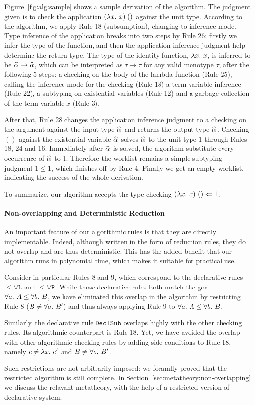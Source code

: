 Figure~\ref{fig:alg:sample} shows a sample derivation of the algorithm.
The judgment given is to check the application $(\lam x)~()$ against the unit type.
According to the algorithm, we apply Rule 18 (subsumption), changing to inference mode.
Type inference of the application breaks into two steps by Rule 26:
firstly we infer the type of the function,
and then the application inference judgment help determine the return type.
The type of the identity function, $\lam x$, is inferred to be $\al \to \al$,
which can be interpreted as $\tau \to \tau$ for any valid monotype $\tau$,
after the following 5 steps:
a checking on the body of the lambda function (Rule 25),
calling the inference mode for the checking (Rule 18)
a term variable inference (Rule 22),
a subtyping on existential variables (Rule 12) and
a garbage collection of the term variable $x$ (Rule 3).

After that, Rule 28 changes the application inference judgment to
a checking on the argument against the input type $\al$ and returns the output type $\al$.
Checking $()$ against the existential variable $\al$ solves $\al$ to the unit type $1$
through Rules 18, 24 and 16.
Immediately after $\al$ is solved, the algorithm substitute every occurrence of $\al$ to $1$.
Therefore the worklist remains a simple subtyping judgment $1 \le 1$, which finishes off by Rule 4.
Finally we get an empty worklist, indicating the success of the whole derivation.

To summarize, our algorithm accepts the type checking $(\lam x)~() \Lto 1$.



\paragraph{Non-overlapping and Deterministic Reduction}
An important feature of our algorithmic rules is that they are directly
implementable. Indeed, although written in the form of reduction rules, they do
not overlap and are thus deterministic.  This has the added benefit that our
algorithm runs in polynomial time, which makes it suitable for practical use.

Consider in particular Rules 8 and 9, which correspond to the declarative rules
$\mathtt{{\le}\forall L}$ and $\mathtt{{\le}\forall R}$. While those
declarative rules both match the goal $\all A\le \all[b]B$,
we have eliminated this overlap in the algorithm by restricting Rule 8
($B\neq\all B'$) and thus always applying Rule 9 to $\all A\le \all[b]B$.

Similarly, the declarative rule $\mathtt{DeclSub}$ overlaps highly with the
other checking rules. Its algorithmic counterpart is Rule 18. Yet, we have
avoided the overlap with other algorithmic checking rules by adding
side-conditions to Rule 18, namely $e\neq\lam e'$ and $B\neq\all B'$.

Such restrictions are not arbitrarily imposed:
we foramlly proved that the restricted algorithm is still complete.
In Section~\ref{sec:metatheory:non-overlapping} we discuss the relavant metatheory,
with the help of a restricted version of declarative system.

